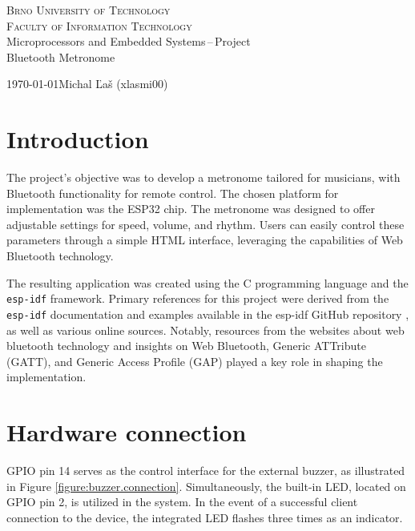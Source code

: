 \documentclass[a4paper, 11pt, a4paper]{article}
\begin{document}
\begin{titlepage}
    \begin{center}
            \textsc{\Huge Brno University of Technology \\}
            \vspace{0.5em}
            \textsc{\huge Faculty of Information Technology \\}
            {\LARGE Microprocessors and Embedded Systems\,--\,Project \\ 
            \vspace{0.4em}
            \Huge Bluetooth Metronome}
    \end{center}
    {\Large \today \hfill Michal Ľaš (xlasmi00)}
\end{titlepage}

\tableofcontents
\newpage

\section{Introduction}

The project's objective was to develop a metronome tailored for musicians, with Bluetooth functionality for remote control.
The chosen platform for implementation was the ESP32 chip. The metronome was designed to offer adjustable settings for speed, 
volume, and rhythm. Users can easily control these parameters through a simple HTML interface, leveraging the capabilities 
of Web Bluetooth technology.

The resulting application was created using the C programming language and the \texttt{esp-idf} framework. Primary references for this project 
were derived from the \texttt{esp-idf} documentation \cite{esp.guide} and examples available in the esp-idf GitHub repository \cite{esp.idf}, as well as various online sources. 
Notably, resources from the websites about web bluetooth technology \cite{JS.BLE} and insights on Web Bluetooth, Generic ATTribute (GATT), and  
Generic Access Profile (GAP) \cite{BLE.guid} played a key role in shaping the implementation.

\section{Hardware connection}

GPIO pin 14 serves as the control interface for the external buzzer, as illustrated in Figure \ref{figure:buzzer.connection}. Simultaneously, 
the built-in LED, located on GPIO pin 2, is utilized in the system. In the event of a successful client connection to the device, 
the integrated LED flashes three times as an indicator.
\end{document}
